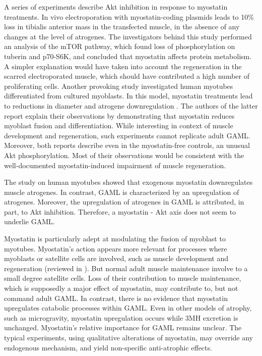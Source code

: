 \documentclass[12pt,english]{report}\usepackage[]{graphicx}\usepackage[]{color}
\begin{document}
A series of experiments describe Akt inhibition in response to myostatin
treatments. In vivo electroporation with myostatin-coding plasmids
leads to 10\% loss in tibialis anterior mass in the transfected muscle,
in the absence of any changes at the level of atrogenes\citep{amirouche2009down-regulation}.
The investigators behind this study performed an analysis of the mTOR
pathway, which found loss of phosphorylation on tuberin and p70-S6K,
and concluded that myostatin affects protein metabolism. A simpler
explanation would have taken into account the regeneration in the
scarred electroporated muscle, which should have contributed a high
number of proliferating cells. Another provoking study investigated
human myotubes differentiated from cultured myoblasts. In this model,
myostatin treatments lead to reductions in diameter and atrogene downregulation
\citep{trendelenburg2009myostatin}. The authors of the latter report
explain their observations by demonstrating that myostatin reduces
myoblast fusion and differentiation. While interesting in context
of muscle development and regeneration, such experiments cannot replicate
adult GAML. Moreover, both reports describe even in the myostatin-free
controls, an unusual Akt phosphorylation. Most of their observations
would be consistent with the well-documented myostatin-induced impairment
of muscle regeneration\citep{mccroskery2003myostatin,cohen2015genetic}.

The study on human myotubes\citep{trendelenburg2009myostatin} showed
that exogenous myostatin downregulates muscle atrogenes. In contrast,
GAML is characterized by an upregulation of atrogenes. Moreover, the
upregulation of atrogenes in GAML is attributed, in part, to Akt inhibition.
Therefore, a myostatin - Akt axis does not seem to underlie GAML.

Myostatin is particularly adept at modulating the fusion of myoblast
to myotubes\citep{nozaki2008improved}. Myostatin's action appears
more relevant for processes where myoblasts or satellite cells are
involved, such as muscle development and regeneration (reviewed in
\citep{carnac2007myostatin,elliott2012central}). But normal adult
muscle maintenance involve to a small degree satellite cells. Loss
of their contribution to muscle maintenance, which is supposedly a
major effect of myostatin, may contribute to, but not command adult
GAML. In contrast, there is no evidence that myostatin upregulates
catabolic processes within GAML. Even in other models of atrophy,
such as microgravity, myostatin upregulation occurs while 3MH excretion
is unchanged\citep{lalani2000myostatin}. Myostatin's relative importance
for GAML remains unclear. The typical experiments, using qualitative
alterations of myostatin, may override any endogenous mechanism, and
yield non-specific anti-atrophic effects.
\end{document}
